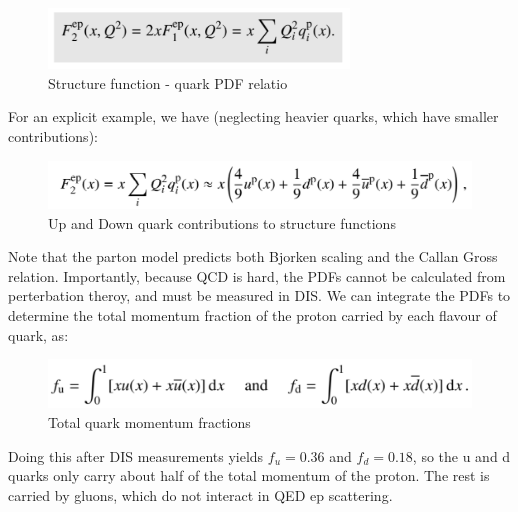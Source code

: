                 
        \begin{figure}[H]
            \centering
            \includegraphics[width=8cm]{Chapters/Ch1-Intro/Ch1-Sec1-Background/pics/inelastic-ep/f2-sum-q.PNG}
            \caption{Structure function - quark PDF relatio}
        \end{figure}
        
        For an explicit example, we have (neglecting heavier quarks, which have smaller contributions):
        
                
        \begin{figure}[H]
            \centering
            \includegraphics[width=12cm]{Chapters/Ch1-Intro/Ch1-Sec1-Background/pics/inelastic-ep/example-f2.PNG}
            \caption{Up and Down quark contributions to structure functions}
        \end{figure}
        
        Note that the parton model predicts both Bjorken scaling and the Callan Gross relation. Importantly, because QCD is hard, the PDFs cannot be calculated from perterbation theroy, and must be measured in DIS. We can integrate the PDFs to determine the total momentum fraction of the proton carried by each flavour of quark, as:
        
                
        \begin{figure}[H]
            \centering
            \includegraphics[width=12cm]{Chapters/Ch1-Intro/Ch1-Sec1-Background/pics/inelastic-ep/integrated-ud.PNG}
            \caption{Total quark momentum fractions}
        \end{figure}
        
        Doing this after DIS measurements yields $f_u = 0.36$ and $f_d = 0.18$, so the u and d quarks only carry about half of the total momentum of the proton. The rest is carried by gluons, which do not interact in QED ep scattering. \\
        
